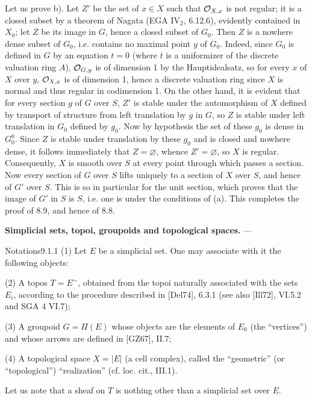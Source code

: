 Let us prove b). Let $Z'$ be the set of $x\in X$ such that $\mathcal{O}_{X,x}$ is not regular; it is a closed subset by a theorem of Nagata (EGA IV$_2$, 6.12.6), evidently contained in $X_0$; let $Z$ be its image in $G$, hence a closed subset of $G_0$. Then $Z$ is a nowhere dense subset of $G_0$, i.e. contains no maximal point $y$ of $G_0$. Indeed, since $G_0$ is defined in $G$ by an equation $t=0$ (where $t$ is a uniformizer of the discrete valuation ring $A$), $\mathcal{O}_{G,y}$ is of dimension 1 by the Hauptidealsatz, so for every $x$ of $X$ over $y$, $\mathcal{O}_{X,x}$ is of dimension 1, hence a discrete valuation ring since $X$ is normal and thus regular in codimension 1. On the other hand, it is evident that for every section $g$ of $G$ over $S$, $Z'$ is stable under the automorphism of $X$ defined by transport of structure from left translation by $g$ in $G$, so $Z$ is stable under left translation in $G_0$ defined by $g_0$. Now by hypothesis the set of these $g_0$ is dense in $G_0^0$. Since $Z$ is stable under translation by these $g_0$ and is closed and nowhere dense, it follows immediately that $Z=\varnothing$, whence $Z'=\varnothing$, so $X$ is regular. Consequently, $X$ is smooth over $S$ at every point through which passes a section. Now every section of $G$ over $S$ lifts uniquely to a section of $X$ over $S$, and hence of $G'$ over $S$. This is so in particular for the unit section, which proves that the image of $G'$ in $S$ is $S$, i.e. one is under the conditions of (a). This completes the proof of 8.9, and hence of 8.8.

\textbf{Simplicial sets, topoi, groupoids and topological spaces.} ---
\begin{enoncerm}{Notations}{9.1.1}\label{X.9.1.1}
(1) Let $E$ be a simplicial set. One may associate with it the following objects:

(2) A topos $T=E^\sim$, obtained from the topoi naturally associated with the sets $E_i$, according to the procedure described in [Del74], 6.3.1 (see also [Ill72], VI.5.2 and SGA 4 VI.7);

(3) A groupoid $G=\Pi(E)$ whose objects are the elements of $E_0$ (the ``vertices'') and whose arrows are defined in [GZ67], II.7;

(4) A topological space $X=|E|$ (a cell complex), called the ``geometric'' (or ``topological'') ``realization'' (cf. loc. cit., III.1).
\end{enoncerm}
Let us note that a sheaf on $T$ is nothing other than a simplicial set over $E$.

